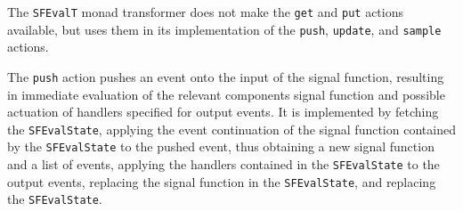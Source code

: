 The {\tt SFEvalT} monad transformer does not make the {\tt get} and {\tt put}
actions available, but uses them in its implementation of the {\tt push},
{\tt update}, and {\tt sample} actions.

The {\tt push} action pushes an event onto the input of the signal function,
resulting in immediate evaluation of the relevant components signal function
and possible actuation of handlers specified for output events. It is
implemented by fetching the {\tt SFEvalState}, applying the event continuation
of the signal function contained by the {\tt SFEvalState} to the pushed event,
thus obtaining a new signal function and a list of events, applying the handlers
contained in the {\tt SFEvalState} to the output events, replacing the signal
function in the {\tt SFEvalState}, and replacing the {\tt SFEvalState}.
